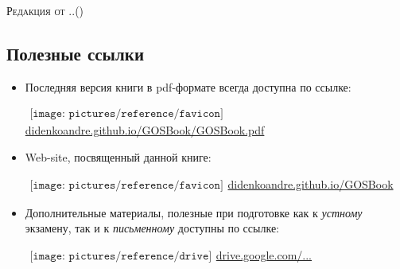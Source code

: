 {\LARGE\scshape Редакция от \twodigit\day.\twodigit\month.\the\year \;(\currenttime)}\par 

\vspace*{-1\baselineskip}  
\begin{flushleft}
\section*{\Large Полезные ссылки}
\begin{itemize}[wide, labelwidth=!, labelindent=0pt, label=$\blacktriangleright$, noitemsep]
\item Последняя версия книги в pdf-формате всегда доступна по ссылке:

\qquad\href{https://didenkoandre.github.io/GOSBook/GOSBook.pdf}{$
\begin{array}{l}
\texttt{[image: pictures/reference/favicon]}
\end{array}
$\large didenkoandre.github.io/GOSBook/GOSBook.pdf}

\item Web-site, посвященный данной книге:

\qquad\href{https://didenkoandre.github.io/GOSBook}{$
\begin{array}{l}
\texttt{[image: pictures/reference/favicon]}
\end{array}
$\large didenkoandre.github.io/GOSBook}
\iffalse
\qquad\href{http://latexonline.cc/compile?git=https://github.com/DidenkoAndre/GOSBook&target=GOSBook.tex&download=GOSBook.pdf&command=pdflatex}{$
\begin{array}{l}
\texttt{[image: pictures/reference/latexonline]}
\end{array}
$\large latexonline.cc/...}

\qquad\href{https://www.dropbox.com/s/nly4ewbfcyrc8es/GOSBook.pdf?dl=0}{$
\begin{array}{l}
\texttt{[image: pictures/reference/dropbox]}
\end{array}
$\large dropbox.com/...}
\fi

\item Дополнительные материалы, полезные при подготовке как к \textit{устному} экзамену, так и к \textit{письменному} доступны по ссылке:

\qquad\href{https://drive.google.com/drive/u/0/folders/0BzuzEyNkpwYDYjVNcE0wa3hqWjA}{$
\begin{array}{l}
\texttt{[image: pictures/reference/drive]}
\end{array}
$\large drive.google.com/...}


\end{itemize}
\end{flushleft}
